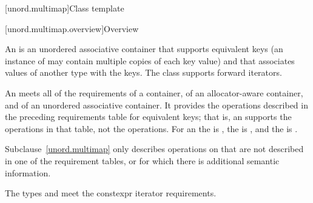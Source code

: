 [unord.multimap]{Class template }%

[unord.multimap.overview]{Overview}

\pnum
{}%
%
An  is an unordered associative container
that supports equivalent keys (an instance of  may contain
multiple copies of each key value) and that associates values of
another type  with the keys.
The  class
supports forward iterators.

\pnum
An  meets all of the requirements
of a container,
of an allocator-aware container, and
of an unordered associative container.
It provides the operations described in the
preceding requirements table for equivalent keys; that is, an 
supports the  operations in that table, not the  operations.
For an  the  is ,
the  is ,
and the  is .

\pnum
Subclause~\ref{unord.multimap} only describes operations on 
that are not described in one of the requirement tables, or for which
there is additional semantic information.

\pnum
The types  and  meet
the constexpr iterator requirements.

